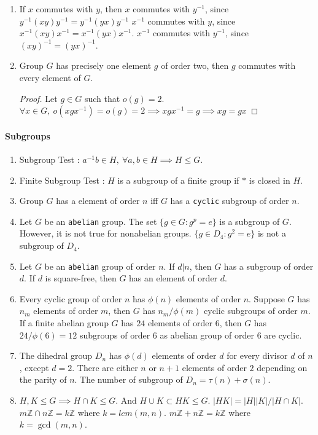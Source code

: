 \begin{enumerate}
	\item If $x$ commutes with $y$, then
		\subitem $x$ commutes with $y^{-1}$, since $y^{-1}(xy)y^{-1} = y^{-1}(yx)y^{-1}$
		\subitem $x^{-1}$ commutes with $y$, since $x^{-1}(xy)x^{-1} = x^{-1}(yx)x^{-1}$.
		\subitem $x^{-1}$ commutes with $y^{-1}$, since $(xy)^{-1} = (yx)^{-1}$.
	\item Group $G$ has precisely one element $g$ of order two, then $g$ commutes with every element of $G$.
	\begin{proof}
		Let $g \in G$ such that $o(g) = 2$.\\
		$\forall x \in G,\ o(xgx^{-1}) = o(g) = 2 \implies xgx^{-1} = g \implies xg = gx$
	\end{proof}
\end{enumerate}

\paragraph{Subgroups}
\begin{enumerate}
	\item Subgroup Test : $a^{-1}b \in H,\ \forall a,b \in H \implies H \le G$.
	\item Finite Subgroup Test : $H$ is a subgroup of a finite group if $\ast$ is closed in $H$.
	\item Group $G$ has a element of order $n$ iff $G$ has a \texttt{cyclic} subgroup of order $n$. 
	\item Let $G$ be an \texttt{abelian} group. The set $\{ g \in G : g^p = e \}$ is a subgroup of $G$.
	However, it is not true for nonabelian groups.
	$\{ g \in D_4 : g^2 = e \}$ is not a subgroup of $D_4$.
	\item Let $G$ be an \texttt{abelian} group of order $n$. If $d|n$, then $G$ has a subgroup of order $d$. If $d$ is square-free, then $G$ has an element of order $d$.
	\item Every cyclic group of order $n$ has $\phi(n)$ elements of order $n$.
		Suppose $G$ has $n_m$ elements of order $m$, then $G$ has $n_m/\phi(m)$ cyclic subgroups of order $m$.
		\subitem If a finite abelian group $G$ has $24$ elements of order $6$, then $G$ has $24/\phi(6) = 12$ subgroups of order $6$ as abelian group of order $6$ are cyclic.
	\item The dihedral group $D_n$ has $\phi(d)$ elements of order $d$ for every divisor $d$ of $n$, except $d=2$. There are either $n$ or $n+1$ elements of order $2$ depending on the parity of $n$.
	The number of subgroup of $D_n = \tau(n)+\sigma(n)$.
	\item $H,K \le G \implies H \cap K \le G$. And $H \cup K \subset HK \le G$.
		\subitem $|HK| = |H| |K| / |H \cap K|$.
		\subitem $m\mathbb{Z} \cap n\mathbb{Z} = k\mathbb{Z}$ where $k = lcm(m,n)$.
		\subitem $m\mathbb{Z} + n\mathbb{Z} = k\mathbb{Z}$ where $k = \gcd(m,n)$.
\end{enumerate}


